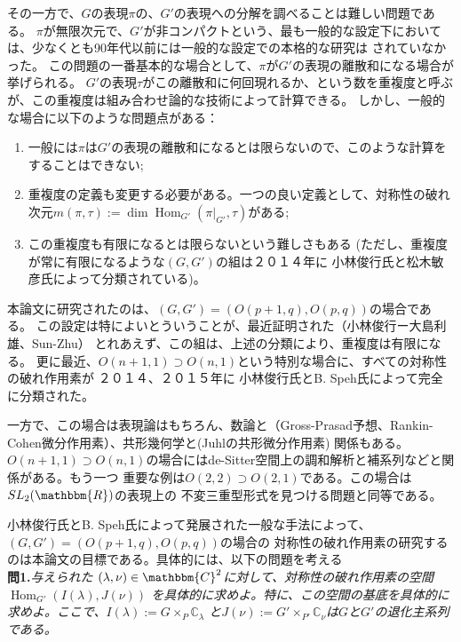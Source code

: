 \documentclass[a4paper,10pt]{article} %
\newcommand{\assign}{:=}
\newcommand{\tmop}[1]{\ensuremath{\operatorname{#1}}}
\newcommand{\tmtextbf}[1]{{\bfseries{#1}}}
\newcommand{\tmtextit}[1]{{\itshape{#1}}}
\begin{document}
その一方で、$G$の表現$\pi$の、$G'$の表現への分解を調べることは難しい問題である。
$\pi$が無限次元で、$G'$が非コンパクトという、最も一般的な設定下においては、少なくとも90年代以前には一般的な設定での本格的な研究は
されていなかった。
この問題の一番基本的な場合として、$\pi$が$G'$の表現の離散和になる場合が挙げられる。
$G'$の表現$\tau$がこの離散和に何回現れるか、という数を重複度と呼ぶが、この重複度は組み合わせ論的な技術によって計算できる。
しかし、一般的な場合に以下のような問題点がある：
\begin{enumerate}
\item 一般には$\pi$は$G'$の表現の離散和になるとは限らないので、このような計算をすることはできない;
\item 重複度の定義も変更する必要がある。一つの良い定義として、対称性の破れ次元$m(\pi,\tau)\assign\dim\tmop{Hom}_{G'}(\pi |_{G'},
 \tau)$がある;
\item この重複度も有限になるとは限らないという難しさもある (ただし、重複度が常に有限になるような$(G,G')$の組は２０１４年に
小林俊行氏と松木敏彦氏によって分類されている)。
\end{enumerate}

本論文に研究されたのは、$( G, G') = ( O ( p + 1, q), O ( p,q))$の場合である。
この設定は特によいとういうことが、最近証明された（小林俊行ー大島利雄、Sun-Zhu）
とれあえず、この組は、上述の分類により、重複度は有限になる。
更に最近、$O ( n + 1, 1) \supset O ( n, 1)$という特別な場合に、すべての対称性の破れ作用素が
２０１４、２０１５年に
小林俊行氏とB. Speh氏によって完全に分類された。

一方で、この場合は表現論はもちろん、数論と（Gross-Prasad予想、Rankin-Cohen微分作用素）、共形幾何学と(Juhlの共形微分作用素)
関係もある。$O ( n + 1, 1) \supset O ( n, 1)$の場合にはde-Sitter空間上の調和解析と補系列などと関係がある。もう一つ
重要な例は$O ( 2, 2) \supset O ( 2, 1)$である。この場合は$SL_2(\mathbbm{R})$の表現上の
不変三重型形式を見つける問題と同等である。

小林俊行氏とB. Speh氏によって発展された一般な手法によって、$( G, G') = ( O ( p + 1, q), O ( p,q))$の場合の
対称性の破れ作用素の研究するのは本論文の目標である。具体的には、以下の問題を考える\\

{\noindent}\tmtextbf{問\textbf{1}.}\tmtextit{与えられた $( \lambda, \nu) \in
\mathbbm{C}^2$に対して、対称性の破れ作用素の空間 $\tmop{Hom}_{G'} ( I (
\lambda), J ( \nu))$ を具体的に求めよ。特に、この空間の基底を具体的に求めよ。ここで、$I(\lambda):=G\times_P\mathbb{C}_\lambda$
と$J(\nu):=G'\times_{P'}\mathbb{C}_\nu$は$G$と$G'$の退化主系列である。}\\
\end{document}
